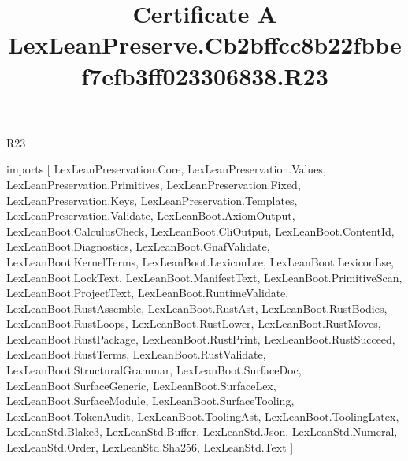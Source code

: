 \begin{lexlean}{R23}
\title{Certificate A LexLeanPreserve.Cb2bffcc8b22fbbef7efb3ff023306838.R23}
\begin{coremodule}
imports [
  LexLeanPreservation.Core,
  LexLeanPreservation.Values,
  LexLeanPreservation.Primitives,
  LexLeanPreservation.Fixed,
  LexLeanPreservation.Keys,
  LexLeanPreservation.Templates,
  LexLeanPreservation.Validate,
  LexLeanBoot.AxiomOutput,
  LexLeanBoot.CalculusCheck,
  LexLeanBoot.CliOutput,
  LexLeanBoot.ContentId,
  LexLeanBoot.Diagnostics,
  LexLeanBoot.GnafValidate,
  LexLeanBoot.KernelTerms,
  LexLeanBoot.LexiconLre,
  LexLeanBoot.LexiconLse,
  LexLeanBoot.LockText,
  LexLeanBoot.ManifestText,
  LexLeanBoot.PrimitiveScan,
  LexLeanBoot.ProjectText,
  LexLeanBoot.RuntimeValidate,
  LexLeanBoot.RustAssemble,
  LexLeanBoot.RustAst,
  LexLeanBoot.RustBodies,
  LexLeanBoot.RustLoops,
  LexLeanBoot.RustLower,
  LexLeanBoot.RustMoves,
  LexLeanBoot.RustPackage,
  LexLeanBoot.RustPrint,
  LexLeanBoot.RustSucceed,
  LexLeanBoot.RustTerms,
  LexLeanBoot.RustValidate,
  LexLeanBoot.StructuralGrammar,
  LexLeanBoot.SurfaceDoc,
  LexLeanBoot.SurfaceGeneric,
  LexLeanBoot.SurfaceLex,
  LexLeanBoot.SurfaceModule,
  LexLeanBoot.SurfaceTooling,
  LexLeanBoot.TokenAudit,
  LexLeanBoot.ToolingAst,
  LexLeanBoot.ToolingLatex,
  LexLeanStd.Blake3,
  LexLeanStd.Buffer,
  LexLeanStd.Json,
  LexLeanStd.Numeral,
  LexLeanStd.Order,
  LexLeanStd.Sha256,
  LexLeanStd.Text
]


\end{coremodule}
\end{lexlean}

